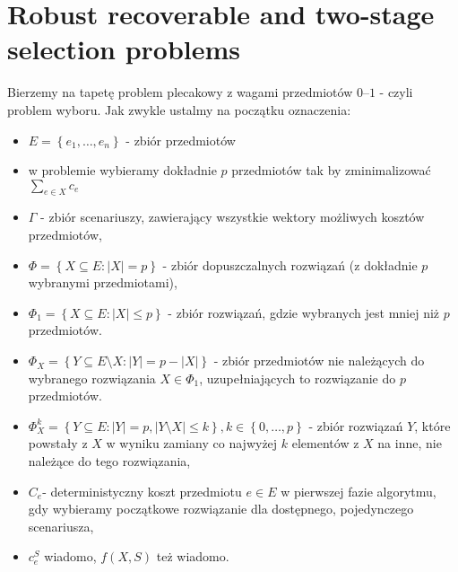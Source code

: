 \chapter{Robust recoverable and two-stage selection problems}
\thispagestyle{chapterBeginStyle}

Bierzemy na tapetę problem plecakowy z wagami przedmiotów $0$--$1$ - czyli problem wyboru. Jak zwykle ustalmy na początku oznaczenia:

\begin{itemize}
	\item $E = \left\{ e_{1}, \dots, e_{n} \right\}$ - zbiór przedmiotów
	\item w problemie wybieramy dokładnie $p$ przedmiotów tak by zminimalizować $\sum_{e \in X} c_{e}$
	\item $\Gamma$ - zbiór scenariuszy, zawierający wszystkie wektory możliwych kosztów przedmiotów,
	\item $\Phi = \left\{ X \subseteq E : \left| X \right| = p \right\}$ - zbiór dopuszczalnych rozwiązań (z dokładnie $p$ wybranymi przedmiotami),
	\item $\Phi_{1} = \left\{ X \subseteq E : \left| X \right| \leqslant p \right\}$ - zbiór rozwiązań, gdzie wybranych jest mniej niż $p$ przedmiotów.
	\item $\Phi_{X} = \left\{ Y \subseteq E \setminus X : \left| Y \right| = p - \left| X \right| \right\}$ - zbiór przedmiotów nie należących do wybranego rozwiązania $X \in \Phi_{1}$, uzupełniających to rozwiązanie do $p$ przedmiotów.
	\item $\Phi_{X}^{k} = \left\{ Y \subseteq E : \left| Y \right| = p, \left| Y \setminus X \right| \leqslant k \right\}, k \in \left\{ 0, \dots, p \right\}$ - zbiór rozwiązań $Y$, które powstały z $X$ w wyniku zamiany co najwyżej $k$ elementów z $X$ na inne, nie należące do tego rozwiązania,
	\item $C_{e} $- deterministyczny koszt przedmiotu $e \in E$ w pierwszej fazie algorytmu, gdy wybieramy początkowe rozwiązanie dla dostępnego, pojedynczego scenariusza,
	\item $c_{e}^{S}$ wiadomo, $ f \left( X, S \right)$ też wiadomo.
\end{itemize}

